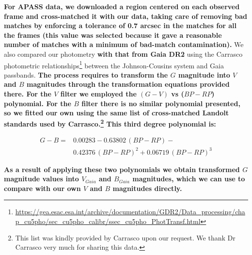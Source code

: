\documentclass[referee]{aa}
\begin{document}
\textbf{
For APASS data, we downloaded a region centered on each
observed frame and cross-matched it with our data, taking care of removing
bad matches by enforcing a tolerance of 0.7 arcsec in the matches for all the
frames (this value was selected because it gave a reasonable number of
matches with a minimum of bad-match contamination).
}
%
We also compared our photometry \textbf{with that from Gaia DR2} using the
Carrasco photometric
relationships\footnote{\url{https://gea.esac.esa.int/archive/documentation/GDR2/Data_processing/chap_cu5pho/sec_cu5pho_calibr/ssec_cu5pho_PhotTransf.html}}
between the Johnson-Cousins system and Gaia passbands. \textbf{The process
requires to transform the $G$ magnitude into $V$ and $B$ magnitudes through the
transformation equations provided there. For the $V$ filter we employed the
$(G-V)$ vs ($BP-RP$) polynomial. For the $B$ filter there is no similar
polynomial presented, so we fitted our own using the same list of
cross-matched Landolt standards used by Carrasco.\footnote{This list was kindly
provided by Carrasco upon our request. We thank Dr Carrasco very much for
sharing this data.} This third degree polynomial is:}

\begin{equation}
\begin{aligned}
G - B = {} & 0.00283-0.63802\,(BP-RP)- \\
        & 0.42376\,(BP-RP)^2+0.06719\,(BP-RP)^3
\end{aligned}
\end{equation}

\noindent\textbf{
As a result of applying these two polynomials we obtain transformed $G$
magnitude values into $V_{Gaia}$ and $B_{Gaia}$ magnitudes, which we can use to
compare with our own $V$ and $B$ magnitudes directly.
}
\end{document}
